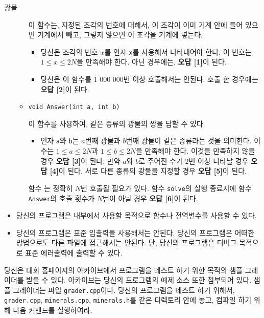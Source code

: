 \begin{problem}{광물}
\begin{itemize}
\begin{itemize}
			이 함수는, 지정된 조각의 번호에 대해서, 이 조각이 이미 기계 안에 들어 있으면 기계에서 빼고, 그렇지 않으면 이 조각을 기계에 넣는다.
						
			\begin{itemize}
				\item 당신은 조각의 번호 $x$를 인자 \texttt{x}를 사용해서 나타내어야 한다. 이 번호는 $1 \le x \le 2N$을 만족해야 한다. 아닌 경우에는, \textbf{오답 [1]}이 된다.
				
				\item 당신은 이 함수를 1 000 000번 이상 호출해서는 안된다. 호출 한 경우에는 \textbf{오답 [2]}이 된다.
			\end{itemize}
			
			\item \texttt{void Answer(int a, int b)}
			
			이 함수를 사용하여, 같은 종류의 광물의 쌍을 답할 수 있다.
			
			\begin{itemize}
				\item 인자 \texttt{a}와 \texttt{b}는 $a$번째 광물과 $b$번째 광물이 같은 종류라는 것을 의미한다. 이 수는 $1 \le a \le 2N$과 $1 \le b \le 2N$을 만족해야 한다. 이것을 만족하지 않을 경우 \textbf{오답 [3]}이 된다. 만약 $a$와 $b$로 주어진 수가 2번 이상 나타날 경우 \textbf{오답 [4]}이 된다. 서로 다른 종류의 광물을 지정할 경우 \textbf{오답 [5]}이 된다.
			\end{itemize}
		
			함수 는 정확히 $N$번 호출될 필요가 있다. 함수 \texttt{solve}의 실행 종료시에 함수 \texttt{Answer}의 호출 횟수가 $N$번이 아닐 경우 \textbf{오답 [6]}이 된다.
		\end{itemize}
		
	\end{itemize}
	
	\Notes
	
	\begin{itemize}
		\item 당신의 프로그램은 내부에서 사용할 목적으로 함수나 전역변수를 사용할 수 있다.
		\item 당신의 프로그램은 표준 입출력을 사용해서는 안된다. 당신의 프로그램은 어떠한 방법으로도 다른 파일에 접근해서는 안된다. 단, 당신의 프로그램은 디버그 목적으로 표준 에러출력에 출력할 수 있다.
	\end{itemize}
	
	당신은 대회 홈페이지의 아카이브에서 프로그램을 테스트 하기 위한 목적의 샘플 그레이더를 받을 수 있다. 아카이브는 당신의 프로그램의 예제 소스 또한 첨부되어 있다.
	샘플 그레이더는 파일 \texttt{grader.cpp}이다. 당신의 프로그램을 테스트 하기 위해서, \texttt{grader.cpp}, \texttt{minerals.cpp}, \texttt{minerals.h}를 같은 디렉토리 안에 놓고, 컴파일 하기 위해 다음 커맨드를 실행하여라.
	

\end{problem}
